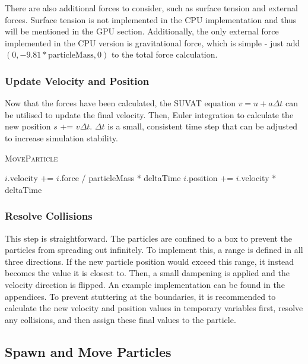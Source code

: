 \documentclass[12pt]{article}
\begin{document}
    There are also additional forces to consider, such as surface tension and external forces. Surface tension is not implemented in the CPU implementation and thus will be mentioned in the GPU section. Additionally, the only external force implemented in the CPU version is gravitational force, which is simple - just add $(0, -9.81 * \text{particleMass}, 0)$ to the total force calculation.

    \subsubsection{Update Velocity and Position}
    Now that the forces have been calculated, the SUVAT equation $v = u + a\Delta{t}$ can be utilised to update the final velocity. Then, Euler integration to calculate the new position $s$ += $v\Delta{t}$. $\Delta{t}$ is a small, consistent time step that can be adjusted to increase simulation stability.

    \begin{algorithm}[H]
        \caption{\textsc{MoveParticle}}
    
        \begin{algorithmic}
                \State $i$.velocity += $i$.force / particleMass * deltaTime
                \State $i$.position += $i$.velocity * deltaTime
            \EndFor
        \end{algorithmic}

    \end{algorithm}

    \subsubsection{Resolve Collisions}

    This step is straightforward. The particles are confined to a box to prevent the particles from spreading out infinitely. To implement this, a range is defined in all three directions. If the new particle position would exceed this range, it instead becomes the value it is closest to. Then, a small dampening is applied and the velocity direction is flipped. An example implementation can be found in the appendices. To prevent stuttering at the boundaries, it is recommended to calculate the new velocity and position values in temporary variables first, resolve any collisions, and then assign these final values to the particle.

    \subsection{Spawn and Move Particles}
\end{document}
